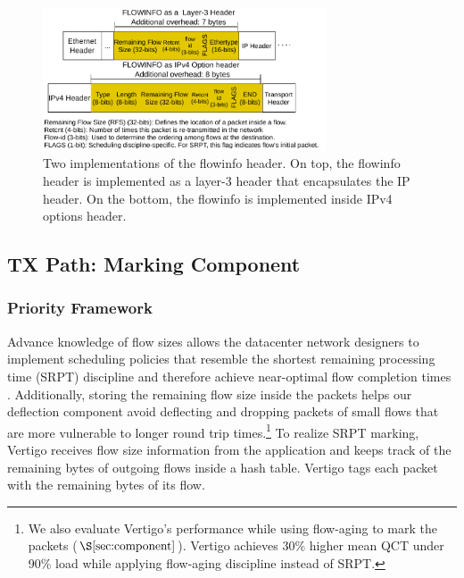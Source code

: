 \begin{figure}[t]
	\centering
	\includegraphics[width=0.75\textwidth]{figs/flowinfo_compact.pdf}
	\caption{\small{Two implementations of the flowinfo header. On top, the flowinfo header is implemented as a layer-3 header that encapsulates the IP header. On the bottom, the flowinfo is implemented inside IPv4 options header.}}
	\label{fig:flowinfo}
		\vspace{-2mm}

\end{figure}

\subsection{TX Path: Marking Component}
\label{sec:prio}

\subsubsection{Priority Framework}

Advance knowledge of flow sizes allows the datacenter network designers to implement scheduling policies that resemble the shortest remaining processing time (SRPT) discipline and therefore achieve near-optimal flow completion times \cite{pfabric, pase, essential, plausible}.
Additionally, storing the remaining flow size inside the packets helps our deflection component avoid deflecting and dropping packets of small flows that are more vulnerable to longer round trip times.\footnote{We also evaluate Vertigo's performance while using flow-aging to mark the packets ($\S \ref{sec:component}$). Vertigo achieves 30\% higher mean QCT under 90\% load while applying flow-aging discipline instead of SRPT.}
To realize SRPT marking, Vertigo receives flow size information from the application and keeps track of the remaining bytes of outgoing flows inside a hash table. Vertigo tags each packet with the remaining bytes of its flow.

